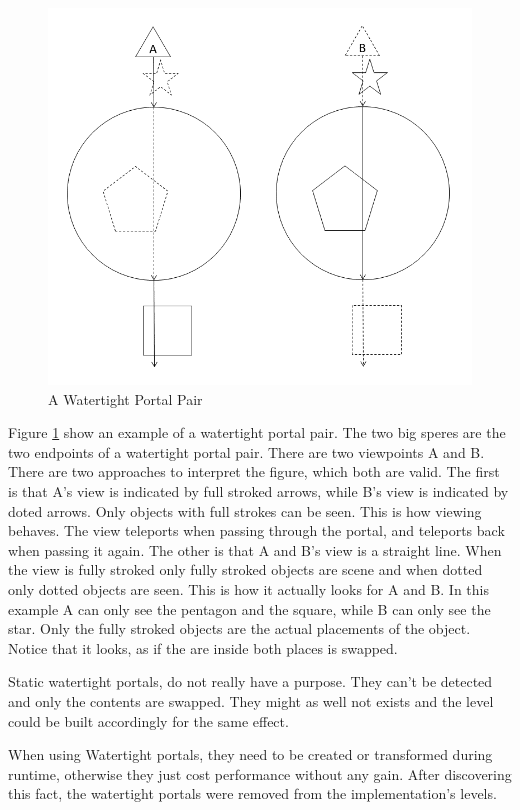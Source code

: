 \begin{figure}[h]
	\centering
	\includegraphics[width=0.8\linewidth]{images/watertight.png}
	\caption{A Watertight Portal Pair}
	\label{fig:watertightportals}
\end{figure}

Figure \ref{fig:watertightportals} show an example of a watertight portal pair. The two big speres are the two endpoints of a watertight portal pair. There are two viewpoints A and B.
There are two approaches to interpret the figure, which both are valid.
The first is that A's view is indicated by full stroked arrows, while B's view is indicated by doted arrows.  Only objects with full strokes can be seen. This is how viewing behaves. The view teleports when passing through the portal, and teleports back when passing it again.
The other is that A and B's view is a straight line. When the view is fully stroked only fully stroked objects are scene and when dotted only dotted objects are seen. This is how it actually looks for A and B.
In this example A can only see the pentagon and the square, while B can only see the star. Only the fully stroked objects are the actual placements of the object. Notice that it looks, as if the are inside both places is swapped.

Static watertight portals, do not really have a purpose. They can't be detected and only the contents are swapped. They might as well not exists and the level could be built accordingly for the same effect.

When using Watertight portals, they need to be created or transformed during runtime, otherwise they just cost performance without any gain. After discovering this fact, the watertight portals were removed from the implementation's levels.

